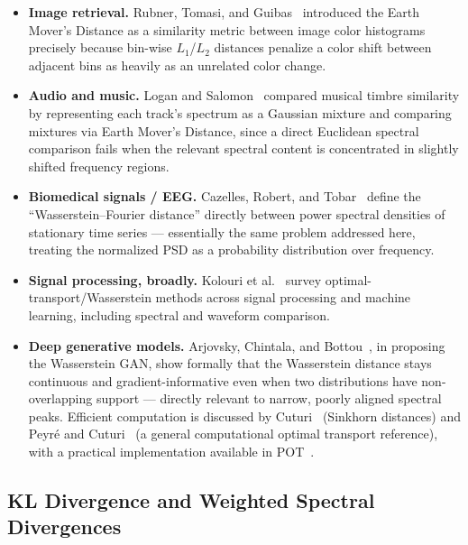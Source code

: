 \documentclass[11pt,a4paper]{article}
\begin{document}
\begin{itemize}[leftmargin=1.4em]
\item \textbf{Image retrieval.} Rubner, Tomasi, and
Guibas~\cite{rubner2000} introduced the Earth Mover's Distance as a
similarity metric between image color histograms precisely because
bin-wise $L_1$/$L_2$ distances penalize a color shift between adjacent bins
as heavily as an unrelated color change.
\item \textbf{Audio and music.} Logan and
Salomon~\cite{logan2001} compared musical timbre similarity by representing
each track's spectrum as a Gaussian mixture and comparing mixtures via
Earth Mover's Distance, since a direct Euclidean spectral comparison fails
when the relevant spectral content is concentrated in slightly shifted
frequency regions.
\item \textbf{Biomedical signals / EEG.} Cazelles, Robert, and
Tobar~\cite{cazelles2021} define the ``Wasserstein--Fourier distance''
directly between power spectral densities of stationary time series —
essentially the same problem addressed here, treating the normalized PSD as
a probability distribution over frequency.
\item \textbf{Signal processing, broadly.} Kolouri et
al.~\cite{kolouri2017} survey optimal-transport/Wasserstein methods across
signal processing and machine learning, including spectral and waveform
comparison.
\item \textbf{Deep generative models.} Arjovsky, Chintala, and
Bottou~\cite{arjovsky2017}, in proposing the Wasserstein GAN, show formally
that the Wasserstein distance stays continuous and gradient-informative even
when two distributions have non-overlapping support — directly relevant to
narrow, poorly aligned spectral peaks. Efficient computation is discussed by
Cuturi~\cite{cuturi2013} (Sinkhorn distances) and Peyré and
Cuturi~\cite{peyre2019} (a general computational optimal transport
reference), with a practical implementation available in
POT~\cite{flamary2021}.
\end{itemize}

\subsection{KL Divergence and Weighted Spectral Divergences}
\end{document}
